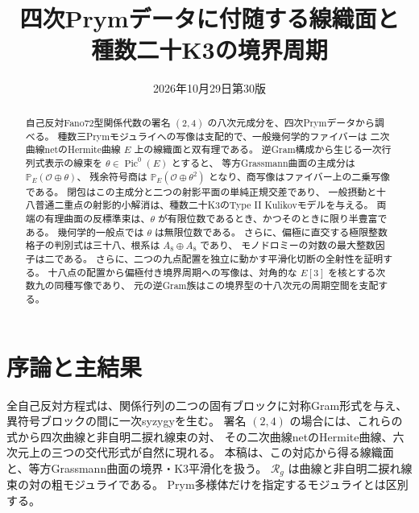 
\title{四次Prymデータに付随する線織面と\\種数二十K3の境界周期}
\author{}\date{2026年10月29日\quad 第30版}

\maketitle
\begin{abstract}
自己反対Fano72型関係代数の署名 $(2,4)$ の八次元成分を、四次Prymデータから調べる。
種数三Prymモジュライへの写像は支配的で、一般幾何学的ファイバーは
二次曲線netのHermite曲線 $E$ 上の線織面と双有理である。
逆Gram構成から生じる一次行列式表示の線束を $\theta\in\operatorname{Pic}^0(E)$ とすると、
等方Grassmann曲面の主成分は $\mathbb P_E(\mathcal O\oplus\theta)$、
残余符号商は $\mathbb P_E(\mathcal O\oplus\theta^2)$ となり、商写像はファイバー上の二乗写像である。
閉包はこの主成分と二つの射影平面の単純正規交差であり、
一般摂動と十八普通二重点の射影的小解消は、種数二十K3のType II Kulikovモデルを与える。
両端の有理曲面の反標準束は、$\theta$ が有限位数であるとき、かつそのときに限り半豊富である。
幾何学的一般点では $\theta$ は無限位数である。
さらに、偏極に直交する極限整数格子の判別式は三十八、根系は $A_8\oplus A_8$ であり、
モノドロミーの対数の最大整数因子は二である。
さらに、二つの九点配置を独立に動かす平滑化切断の全射性を証明する。
十八点の配置から偏極付き境界周期への写像は、対角的な $E[3]$ を核とする次数九の同種写像であり、
元の逆Gram族はこの境界型の十八次元の周期空間を支配する。
\end{abstract}
\begingroup\small\setlength{\parskip}{0pt}\tableofcontents\endgroup
\clearpage

\section{序論と主結果}

全自己反対方程式は、関係行列の二つの固有ブロックに対称Gram形式を与え、
異符号ブロックの間に一次syzygyを生む。
署名 $(2,4)$ の場合には、これらの式から四次曲線と非自明二捩れ線束の対、
その二次曲線netのHermite曲線、六次元上の三つの交代形式が自然に現れる。
本稿は、この対応から得る線織面と、等方Grassmann曲面の境界・K3平滑化を扱う。
$\mathcal R_g$ は曲線と非自明二捩れ線束の対の粗モジュライである。
Prym多様体だけを指定するモジュライとは区別する。

